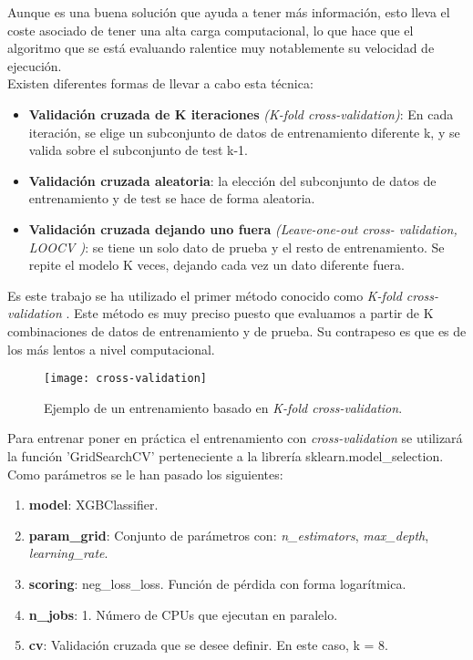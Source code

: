 Aunque es una buena solución que ayuda a tener más información, esto lleva el coste asociado de tener una alta carga computacional, lo que hace que el algoritmo que se está evaluando ralentice muy notablemente su velocidad de ejecución.\\

Existen diferentes formas de llevar a cabo esta técnica:\cite{cv-wiki}
\begin{itemize}
\item \textbf{Validación cruzada de K iteraciones} \textit{(K-fold cross-validation)}: En cada iteración, se elige un subconjunto de datos de entrenamiento diferente k, y se valida sobre el subconjunto de test k-1. 
\item \textbf{Validación cruzada aleatoria}: la elección del subconjunto
de datos de entrenamiento y de test se hace de forma aleatoria.
\item \textbf{Validación cruzada dejando uno fuera} \textit{(Leave-one-out cross-
validation, LOOCV )}: se tiene un solo dato de prueba y el resto de entrenamiento. Se repite el modelo K veces, dejando cada vez un dato diferente fuera.
\end{itemize}

Es este trabajo se ha utilizado el primer método conocido como \textit{K-fold cross-validation} . Este método es muy preciso puesto que evaluamos a partir de K combinaciones de datos de entrenamiento y de prueba\cite{cv-wiki}. Su contrapeso es que es de los más lentos a nivel computacional.\\

\begin{figure}[h]
	\centering
	\texttt{[image: cross-validation]}
	\caption{Ejemplo de un entrenamiento basado en \textit{K-fold cross-validation}.}
	\label{fig:CV}
\end{figure}

Para entrenar poner en práctica el entrenamiento con \textit{cross-validation} se utilizará la función 'GridSearchCV' perteneciente a la librería sklearn.model\_selection. Como parámetros se le han pasado los siguientes:
\begin{enumerate}
\item \textbf{model}: XGBClassifier.
\item \textbf{param\_grid}: Conjunto de parámetros con: \textit{n\_estimators}, \textit{max\_depth}, \textit{learning\_rate}.
\item \textbf{scoring}: neg\_loss\_loss. Función de pérdida con forma logarítmica.
\item \textbf{n\_jobs}: 1. Número de CPUs que ejecutan en paralelo.
\item \textbf{cv}: Validación cruzada que se desee definir. En este caso, k = 8.
\end{enumerate}

